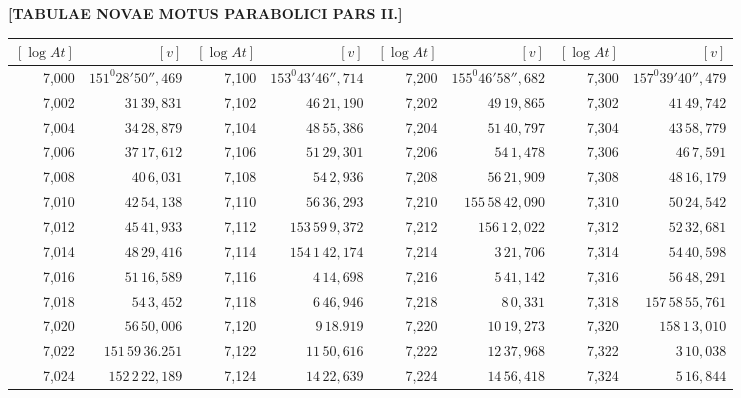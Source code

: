 \clearpage
{}
\begingroup
\centering
\fontsize{9}{9}\selectfont
\setlength{\tabcolsep}{.2pt}
\renewcommand{\arraystretch}{.9}
\setlength{\parskip}{0pt}
\textbf{[TABULAE NOVAE MOTUS PARABOLICI PARS II.]}
\par\vspace{7pt}
\begin{tabular}{|r|r||r|r||r|r||r|r|}
\hline
\([\log At]\) & \([v]\) & \([\log At]\) & \([v]\) & \([\log At]\) & \([v]\) & \([\log At]\) & \([v]\) \\
\hline
7,000 & \(151^{0}28'50'',\!469\) & 7,100 & \(153^{0}43'46'',\!714\) & 7,200 & \(155^{0}46'58'',\!682\) & 7,300 & \(157^{0}39'40'',\!479\) \\[1pt]
7,002 & \(31\,39,\!831\) & 7,102 & \(46\,21,\!190\) & 7,202 & \(49\,19,\!865\) & 7,302 & \(41\,49,\!742\) \\
7,004 & \(34\,28,\!879\) & 7,104 & \(48\,55,\!386\) & 7,204 & \(51\,40,\!797\) & 7,304 & \(43\,58,\!779\) \\
7,006 & \(37\,17,\!612\) & 7,106 & \(51\,29,\!301\) & 7,206 & \(54\,1,\!478\) & 7,306 & \(46\,7,\!591\) \\
7,008 & \(40\,6,\!031\) & 7,108 & \(54\,2,\!936\) & 7,208 & \(56\,21,\!909\) & 7,308 & \(48\,16,\!179\) \\
7,010 & \(42\,54,\!138\) & 7,110 & \(56\,36,\!293\) & 7,210 & \(155\,58\,42,\!090\) & 7,310 & \(50\,24,\!542\) \\[1pt]
7,012 & \(45\,41,\!933\) & 7,112 & \(153\,59\,9,\!372\) & 7,212 & \(156\,1\,2,\!022\) & 7,312 & \(52\,32,\!681\) \\
7,014 & \(48\,29,\!416\) & 7,114 & \(154\,1\,42,\!174\) & 7,214 & \(3\,21,\!706\) & 7,314 & \(54\,40,\!598\) \\
7,016 & \(51\,16,\!589\) & 7,116 & \(4\,14,\!698\) & 7,216 & \(5\,41,\!142\) & 7,316 & \(56\,48,\!291\) \\
7,018 & \(54\,3,\!452\) & 7,118 & \(6\,46,\!946\) & 7,218 & \(8\,0,\!331\) & 7,318 & \(157\,58\,55,\!761\) \\
7,020 & \(56\,50,\!006\) & 7,120 & \(9\,18.919\) & 7,220 & \(10\,19,\!273\) & 7,320 & \(158\,1\,3,\!010\) \\[1pt]
7,022 & \(151\,59\,36.251\) & 7,122 & \(11\,50,\!616\) & 7,222 & \(12\,37,\!968\) & 7,322 & \(3\,10,\!038\) \\
7,024 & \(152\,2\,22,\!189\) & 7,124 & \(14\,22,\!639\) & 7,224 & \(14\,56,\!418\) & 7,324 & \(5\,16,\!844\) \\

\end{tabular}
